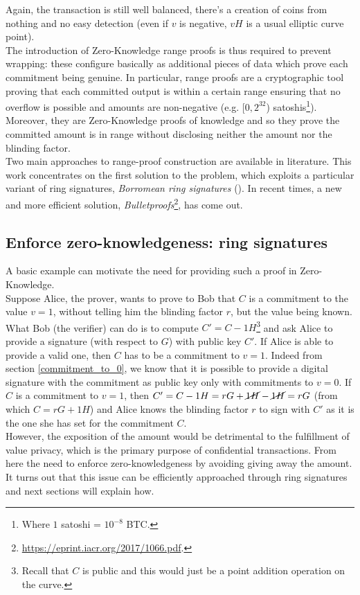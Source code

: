 Again, the transaction is still well balanced, there's a creation of coins from nothing and no easy detection (even if $v$ is negative, $vH$ is a usual elliptic curve point).\\
The introduction of Zero-Knowledge range proofs is thus required to prevent wrapping: these configure basically as additional pieces of data which prove each commitment being genuine. In particular, range proofs are a cryptographic tool proving that each committed output is within a certain range ensuring that no overflow is possible and amounts are non-negative (e.g. [$0,2^{32}$) satoshis\footnote{Where $1$ satoshi = $10^{-8}$ BTC.}). Moreover, they are Zero-Knowledge proofs of knowledge and so they prove the committed amount is in range without disclosing neither the amount nor the blinding factor.\\
Two main approaches to range-proof construction are available in literature. This work concentrates on the first solution to the problem, which exploits a particular variant of ring signatures, \textit{Borromean ring signatures} (\cite{Borromean}). In recent times, a new and more efficient solution, \textit{Bulletproofs}\footnote{\url{https://eprint.iacr.org/2017/1066.pdf}.}, has come out.

\subsection{Enforce zero-knowledgeness: ring signatures}
\label{example:ZK}
A basic example can motivate the need for providing such a proof in Zero-Knowledge.\\ 
Suppose Alice, the prover, wants to prove to Bob that $C$ is a commitment to the value $v=1$, without telling him the blinding factor $r$, but the value being known.\\
What Bob (the verifier) can do is to compute $C' = C - 1H$\footnote{Recall that $C$ is public and this would just be a point addition operation on the curve.} and ask Alice to provide a signature (with respect to $G$) with public key $C'$. If Alice is able to provide a valid one, then $C$ has to be a commitment to $v=1$. Indeed from section \ref{commitment_to_0}, we know that it is possible to provide a digital signature with the commitment as public key only with commitments to $v=0$. If $C$ is a commitment to $v=1$, then $C'= C - 1H = rG + \cancel{1H} - \cancel{1H} = rG$ (from which $C = rG + 1H$) and Alice knows the blinding factor $r$ to sign with $C'$ as it is the one she has set for the commitment $C$.\\
However, the exposition of the amount would be detrimental to the fulfillment of value privacy, which is the primary purpose of confidential transactions. From here the need to enforce zero-knowledgeness by avoiding giving away the amount. It turns out that this issue can be efficiently approached through ring signatures and next sections will explain how.

